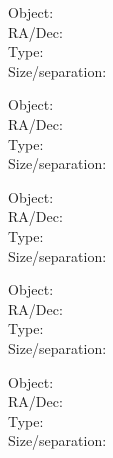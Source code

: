 \newpage

\parbox[b]{8cm}{ Object: \makebox[3cm]{\hrulefill}\\
RA/Dec: \makebox[3cm]{\hrulefill} \\
Type: \makebox[3cm]{\hrulefill} \\
Size/separation:  \makebox[1.5cm]{\hrulefill} \\ }   \begin{minipage}[b]{8cm}{}\end{minipage}

\bigskip\noindent 

\parbox[b]{8cm}{ Object: \makebox[3cm]{\hrulefill}\\
RA/Dec: \makebox[3cm]{\hrulefill} \\
Type: \makebox[3cm]{\hrulefill} \\
Size/separation:  \makebox[1.5cm]{\hrulefill} \\ }   \begin{minipage}[b]{8cm}{}\end{minipage}

\bigskip\noindent 

\parbox[b]{8cm}{ Object: \makebox[3cm]{\hrulefill}\\
RA/Dec: \makebox[3cm]{\hrulefill} \\
Type: \makebox[3cm]{\hrulefill} \\
Size/separation:  \makebox[1.5cm]{\hrulefill} \\ }   \begin{minipage}[b]{8cm}{}\end{minipage}

\bigskip\noindent 

\parbox[b]{8cm}{ Object: \makebox[3cm]{\hrulefill}\\
RA/Dec: \makebox[3cm]{\hrulefill} \\
Type: \makebox[3cm]{\hrulefill} \\
Size/separation:  \makebox[1.5cm]{\hrulefill} \\ }   \begin{minipage}[b]{8cm}{}\end{minipage}

\bigskip\noindent 

\parbox[b]{8cm}{ Object: \makebox[3cm]{\hrulefill}\\
RA/Dec: \makebox[3cm]{\hrulefill} \\
Type: \makebox[3cm]{\hrulefill} \\
Size/separation:  \makebox[1.5cm]{\hrulefill} \\ }   \begin{minipage}[b]{8cm}{}\end{minipage}

\bigskip\noindent 


